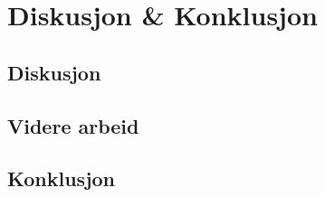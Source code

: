 \section[Diskusjon \& Konklusjon]{Diskusjon \& Konklusjon}
\subsection{Diskusjon}
\subsection{Videre arbeid}
\subsection{Konklusjon}